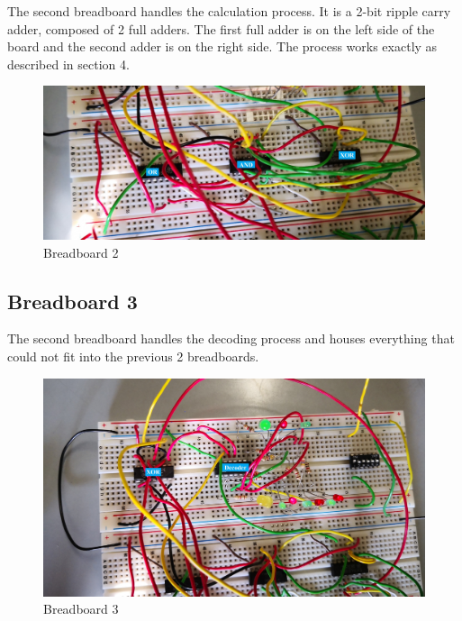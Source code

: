 \documentclass{article}
\begin{document}
The second breadboard handles the calculation process. It is a 2-bit ripple carry adder, composed of 2 full adders. The first full adder is on the left side of the board and the second adder is on the right side. The process works exactly as described in section 4. 

\begin{figure}[h]
  \centering
  \includegraphics[width=\linewidth]{breadboard2}
  \caption{Breadboard 2}
  \label{breadboard2}
\end{figure}

\clearpage

\subsection{Breadboard 3}

The second breadboard handles the decoding process and houses everything that could not fit into the previous 2 breadboards. 

\begin{figure}[h]
  \centering
  \includegraphics[width=\linewidth]{breadboard3}
  \caption{Breadboard 3}
  \label{breadboard3}
\end{figure}
\end{document}
